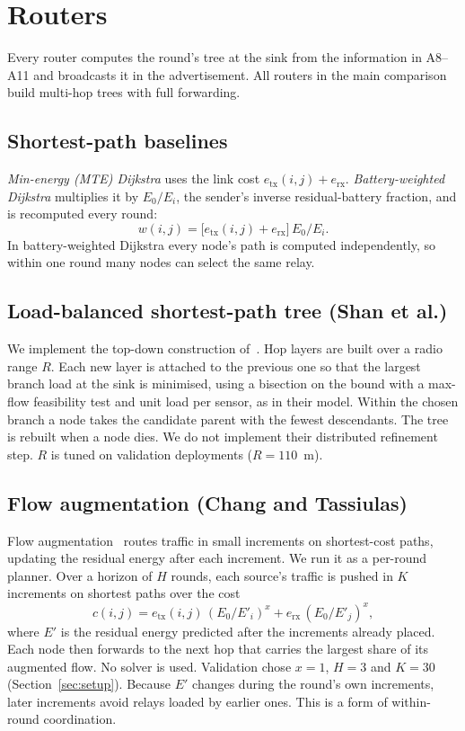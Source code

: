 \section{Routers}\label{sec:methods}

Every router computes the round's tree at the sink from the information in A8--A11 and broadcasts it in the advertisement. All routers in the main comparison build multi-hop trees with full forwarding.

\subsection{Shortest-path baselines}
\emph{Min-energy (MTE) Dijkstra} uses the link cost $e_{\mathrm{tx}}(i,j)+e_{\mathrm{rx}}$. \emph{Battery-weighted Dijkstra} multiplies it by $E_0/E_i$, the sender's inverse residual-battery fraction, and is recomputed every round:
\begin{equation}
w(i,j)=\bigl[e_{\mathrm{tx}}(i,j)+e_{\mathrm{rx}}\bigr]\,E_0/E_i.\label{eq:battery}
\end{equation}
In battery-weighted Dijkstra every node's path is computed independently, so within one round many nodes can select the same relay.

\subsection{Load-balanced shortest-path tree (Shan et al.)}
We implement the top-down construction of~\cite{shan2013lifetime}. Hop layers are built over a radio range $R$. Each new layer is attached to the previous one so that the largest branch load at the sink is minimised, using a bisection on the bound with a max-flow feasibility test and unit load per sensor, as in their model. Within the chosen branch a node takes the candidate parent with the fewest descendants. The tree is rebuilt when a node dies. We do not implement their distributed refinement step. $R$ is tuned on validation deployments ($R=110$~m).

\subsection{Flow augmentation (Chang and Tassiulas)}\label{sec:fa}
Flow augmentation~\cite{chang2004maximum} routes traffic in small increments on shortest-cost paths, updating the residual energy after each increment. We run it as a per-round planner. Over a horizon of $H$ rounds, each source's traffic is pushed in $K$ increments on shortest paths over the cost
\begin{equation}
c(i,j)=e_{\mathrm{tx}}(i,j)\,(E_0/E'_i)^x + e_{\mathrm{rx}}\,(E_0/E'_j)^x,\label{eq:fa}
\end{equation}
where $E'$ is the residual energy predicted after the increments already placed. Each node then forwards to the next hop that carries the largest share of its augmented flow. No solver is used. Validation chose $x=1$, $H=3$ and $K=30$ (Section~\ref{sec:setup}). Because $E'$ changes during the round's own increments, later increments avoid relays loaded by earlier ones. This is a form of within-round coordination.

